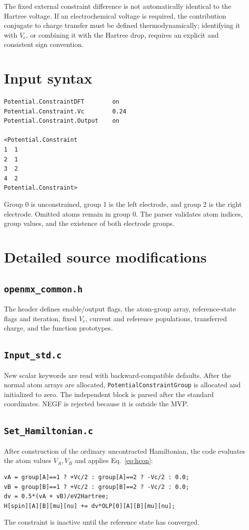 \documentclass[11pt,a4paper]{article}
\begin{document}
The fixed external constraint difference is not automatically identical to
the Hartree voltage. If an electrochemical voltage is required, the contribution
conjugate to charge transfer must be defined thermodynamically; identifying
it with $V_c$, or combining it with the Hartree drop, requires an explicit
and consistent sign convention.

\section{Input syntax}

\begin{lstlisting}[language={}]
Potential.ConstraintDFT        on
Potential.Constraint.Vc        0.24
Potential.Constraint.Output    on

<Potential.Constraint
1  1
2  1
3  2
4  2
Potential.Constraint>
\end{lstlisting}
Group 0 is unconstrained, group 1 is the left electrode, and group 2 is the
right electrode. Omitted atoms remain in group 0. The parser validates atom
indices, group values, and the existence of both electrode groups.

\section{Detailed source modifications}

\subsection{\texttt{openmx\_common.h}}
The header defines enable/output flags, the atom-group array, reference-state
flags and iteration, fixed $V_c$, current and reference populations,
transferred charge, and the function prototypes.

\subsection{\texttt{Input\_std.c}}
New scalar keywords are read with backward-compatible defaults. After the
normal atom arrays are allocated, \texttt{PotentialConstraintGroup} is
allocated and initialized to zero. The independent block is parsed after
the standard coordinates. NEGF is rejected because it is outside the MVP.

\subsection{\texttt{Set\_Hamiltonian.c}}
After construction of the ordinary uncontracted Hamiltonian, the code
evaluates the atom values $V_A,V_B$ and applies Eq.~\eqref{eq:hcon}:
\begin{lstlisting}
vA = group[A]==1 ? +Vc/2 : group[A]==2 ? -Vc/2 : 0.0;
vB = group[B]==1 ? +Vc/2 : group[B]==2 ? -Vc/2 : 0.0;
dv = 0.5*(vA + vB)/eV2Hartree;
H[spin][A][B][mu][nu] += dv*OLP[0][A][B][mu][nu];
\end{lstlisting}
The constraint is inactive until the reference state has converged.
\end{document}
